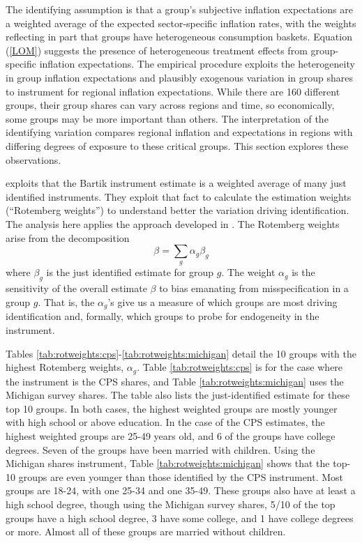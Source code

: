 \documentclass[12pt]{article}
\begin{document}
The identifying assumption is that a group's subjective inflation expectations are a weighted average of the expected sector-specific inflation rates, with the weights reflecting in part that groups have heterogeneous consumption baskets. Equation (\ref{LOM}) suggests the presence of heterogeneous treatment effects from group-specific inflation expectations. The empirical procedure exploits the heterogeneity in group inflation expectations and plausibly exogenous variation in group shares to instrument for regional inflation expectations. While there are 160 different groups, their group shares can vary across regions and time, so economically, some groups may be more important than others. The interpretation of the identifying variation compares regional inflation and expectations in regions with differing degrees of exposure to these critical groups. This section explores these observations.

\cite{Pinkhametal:AER2020} exploits that the Bartik instrument estimate is a weighted average of many just identified instruments. They exploit that fact to calculate the estimation weights (``Rotemberg weights'') to understand better the variation driving identification. The analysis here applies the approach developed in \cite{Pinkhametal:AER2020}. The Rotemberg weights arise from the decomposition
$$ \beta = \sum_g \alpha_g\beta_g$$
where $\beta_g$ is the just identified estimate for group $g$. The weight $\alpha_g$ is the sensitivity of the overall estimate $\beta$ to bias emanating from misspecification in a group $g$. That is, the $\alpha_g$'s give us a measure of which groups are most driving identification and, formally, which groups to probe for endogeneity in the instrument.  




Tables \ref{tab:rotweights:cps}-\ref{tab:rotweights:michigan} detail the 10 groups with the highest Rotemberg weights, $\alpha_g$. Table \ref{tab:rotweights:cps} is for the case where the instrument is the CPS shares, and Table \ref{tab:rotweights:michigan} uses the Michigan survey shares. The table also lists the just-identified estimate for these top 10 groups. In both cases, the highest weighted groups are mostly younger with high school or above education. In the case of the CPS estimates, the highest weighted groups are 25-49 years old, and 6 of the groups have college degrees. Seven of the groups have been married with children. Using the Michigan shares instrument, Table \ref{tab:rotweights:michigan} shows that the top-10 groups are even younger than those identified by the CPS instrument. Most groups are 18-24, with one 25-34 and one 35-49. These groups also have at least a high school degree, though using the Michigan survey shares, 5/10 of the top groups have a high school degree, 3 have some college, and 1 have college degrees or more. Almost all of these groups are married without children.
\end{document}
